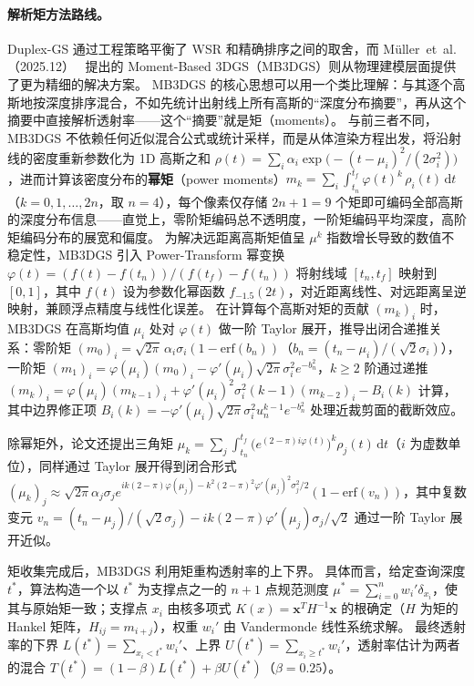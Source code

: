 \paragraph{解析矩方法路线。}
Duplex-GS 通过工程策略平衡了 WSR 和精确排序之间的取舍，而 M\"uller~et~al.（2025.12）~\cite{2512_11800} 提出的 Moment-Based 3DGS（MB3DGS）则从物理建模层面提供了更为精细的解决方案。
MB3DGS 的核心思想可以用一个类比理解：与其逐个高斯地按深度排序混合，不如先统计出射线上所有高斯的“深度分布摘要”，再从这个摘要中直接解析透射率——这个“摘要”就是矩（moments）。
与前三者不同，MB3DGS 不依赖任何近似混合公式或统计采样，而是从体渲染方程出发，将沿射线的密度重新参数化为 1D 高斯之和 $\rho(t) = \sum_i \alpha_i \exp\!\bigl(-{(t - \mu_i)^2}/(2\sigma_i^2)\bigr)$，进而计算该密度分布的\textbf{幂矩}（power moments）$m_k = \sum_i \int_{t_n}^{t_f} \varphi(t)^k\,\rho_i(t)\,\mathrm{d}t$（$k = 0, 1, \ldots, 2n$，取 $n = 4$），每个像素仅存储 $2n\!+\!1 = 9$ 个矩即可编码全部高斯的深度分布信息——直觉上，零阶矩编码总不透明度，一阶矩编码平均深度，高阶矩编码分布的展宽和偏度。
为解决远距离高斯矩值呈 $\mu^k$ 指数增长导致的数值不稳定性，MB3DGS 引入 Power-Transform 幂变换 $\varphi(t) = (f(t) - f(t_n))/(f(t_f) - f(t_n))$ 将射线域 $[t_n, t_f]$ 映射到 $[0,1]$，其中 $f(t)$ 设为参数化幂函数 $f_{-1.5}(2t)$，对近距离线性、对远距离呈逆映射，兼顾浮点精度与线性化误差。
在计算每个高斯对矩的贡献 $(m_k)_i$ 时，MB3DGS 在高斯均值 $\mu_i$ 处对 $\varphi(t)$ 做一阶 Taylor 展开，推导出闭合递推关系：零阶矩 $(m_0)_i = \sqrt{2\pi}\,\alpha_i\sigma_i(1 - \mathrm{erf}(b_n))$（$b_n = (t_n - \mu_i)/(\sqrt{2}\sigma_i)$），一阶矩 $(m_1)_i = \varphi(\mu_i)(m_0)_i - \varphi'(\mu_i)\sqrt{2\pi}\sigma_i^2 e^{-b_n^2}$，$k \geq 2$ 阶通过递推 $(m_k)_i = \varphi(\mu_i)(m_{k-1})_i + \varphi'(\mu_i)^2\sigma_i^2(k\!-\!1)(m_{k-2})_i - B_i(k)$ 计算，其中边界修正项 $B_i(k) = -\varphi'(\mu_i)\sqrt{2\pi}\sigma_i^2 u_n^{k-1} e^{-b_n^2}$ 处理近裁剪面的截断效应。

除幂矩外，论文还提出三角矩 $\mu_k = \sum_j \int_{t_n}^{t_f} \bigl(e^{(2-\pi)i\varphi(t)}\bigr)^k \rho_j(t)\,\mathrm{d}t$（$i$ 为虚数单位），同样通过 Taylor 展开得到闭合形式 $(\mu_k)_j \approx \sqrt{2\pi}\alpha_j\sigma_j e^{i k(2-\pi)\varphi(\mu_j) - k^2(2-\pi)^2\varphi'(\mu_j)^2\sigma_j^2/2}(1 - \mathrm{erf}(v_n))$，其中复数变元 $v_n = (t_n - \mu_j)/(\sqrt{2}\sigma_j) - ik(2-\pi)\varphi'(\mu_j)\sigma_j/\sqrt{2}$ 通过一阶 Taylor 展开近似。

矩收集完成后，MB3DGS 利用矩重构透射率的上下界。
具体而言，给定查询深度 $t^*$，算法构造一个以 $t^*$ 为支撑点之一的 $n\!+\!1$ 点规范测度 $\mu^* = \sum_{i=0}^{n} w_i' \delta_{x_i}$，使其与原始矩一致；支撑点 $x_i$ 由核多项式 $K(x) = \mathbf{x}^T H^{-1}\mathbf{x}$ 的根确定（$H$ 为矩的 Hankel 矩阵，$H_{ij} = m_{i+j}$），权重 $w_i'$ 由 Vandermonde 线性系统求解。
最终透射率的下界 $L(t^*) = \sum_{x_i < t^*} w_i'$、上界 $U(t^*) = \sum_{x_i \geq t^*} w_i'$，透射率估计为两者的混合 $T(t^*) = (1 - \beta)L(t^*) + \beta U(t^*)$（$\beta = 0.25$）。

